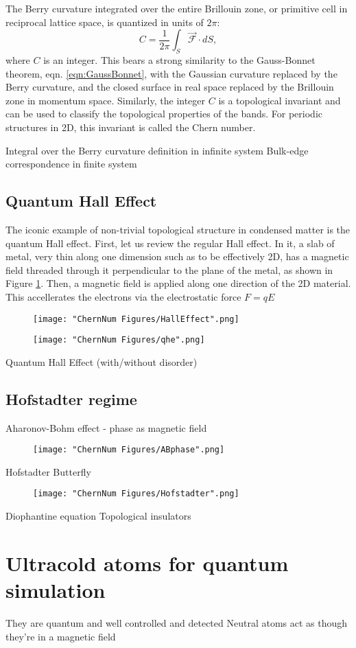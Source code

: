 The Berry curvature integrated over the entire Brillouin zone, or primitive cell in reciprocal lattice space, is quantized in units of $2\pi$:
\begin{equation}
C=\frac{1}{2\pi} \int_S \vec{\mathcal{F}}\cdot dS,
\end{equation}
where $C$ is an integer. This bears a strong similarity to the Gauss-Bonnet theorem, eqn. \ref{eqn:GaussBonnet}, with the Gaussian curvature replaced by the Berry curvature, and the closed surface in real space replaced by the Brillouin zone in momentum space. Similarly, the integer $C$ is a topological invariant and can be used to classify the topological properties of the bands. For periodic structures in 2D, this invariant is called the Chern number. 

	Integral over the Berry curvature definition in infinite system
	Bulk-edge correspondence in finite system


\subsection{Quantum Hall Effect}
The iconic example of non-trivial topological structure in condensed matter is the quantum Hall effect. First, let us review the regular Hall effect. In it, a slab of metal, very thin along one dimension such as to be effectively 2D, has a magnetic field threaded through it perpendicular to the plane of the metal, as shown in Figure \ref{fig:HallEffect}. Then, a magnetic field is applied along one direction of the 2D material. This accellerates the electrons via the electrostatic force $F=qE$ 
\begin{figure}
	\texttt{[image: "ChernNum Figures/HallEffect".png]}
\label{fig:HallEffect}
\caption{}
\end{figure}

\begin{figure}
	\texttt{[image: "ChernNum Figures/qhe".png]}
\label{fig:qhe}
\caption{}
\end{figure}
		Quantum Hall Effect (with/without disorder)

\subsection{Hofstadter regime}
	Aharonov-Bohm effect - phase as magnetic field
\begin{figure}
	\texttt{[image: "ChernNum Figures/ABphase".png]}
\label{fig:ABphase}
\caption{}
\end{figure}
		Hofstadter Butterfly

\begin{figure}
	\texttt{[image: "ChernNum Figures/Hofstadter".png]}
\label{fig:Hofstadter}
\caption{}
\end{figure}
		Diophantine equation 	
		Topological insulators

\section{Ultracold atoms for quantum simulation}
They are quantum and well controlled and detected
Neutral atoms act as though they're in a magnetic field
